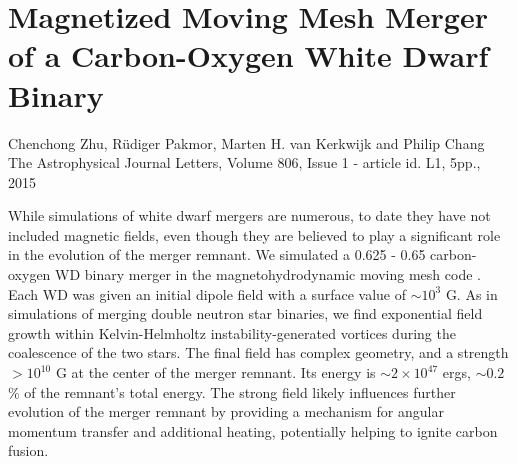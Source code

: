 \chapter{Magnetized Moving Mesh Merger of a Carbon-Oxygen White Dwarf Binary}
\label{ch:ch4}

\begin{center}
\begin{minipage}[c]{4.75in}
Chenchong Zhu, R\"{u}diger Pakmor, Marten H. van Kerkwijk and Philip Chang\\
The Astrophysical Journal Letters, Volume 806, Issue 1 - article id. L1, 5pp., 2015 \citep{zhu+15}
\vspace{2em}
\end{minipage}
\end{center}

While simulations of white dwarf mergers are numerous, to date they have not included magnetic fields, even though they are believed to play a significant role in the evolution of the merger remnant.  We simulated a 0.625 - 0.65 {\Msun} carbon-oxygen WD binary merger in the magnetohydrodynamic moving mesh code {\arepo}.  Each WD was given an initial dipole field with a surface value of $\sim10^3$ G.  As in simulations of merging double neutron star binaries, we find exponential field growth within Kelvin-Helmholtz instability-generated vortices during the coalescence of the two stars.  The final field has complex geometry, and a strength $>10^{10}$ G at the center of the merger remnant.  Its energy is $\sim2\times10^{47}$ ergs, $\sim0.2$\% of the remnant's total energy.  The strong field likely influences further evolution of the merger remnant by providing a mechanism for angular momentum transfer and additional heating, potentially helping to ignite carbon fusion.
